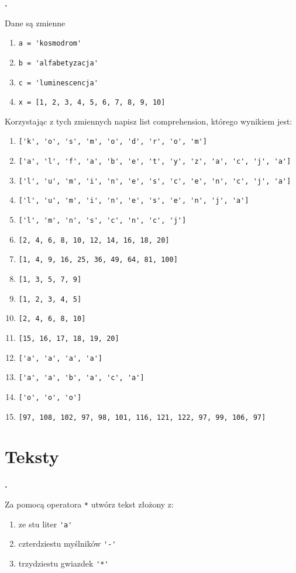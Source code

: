 \documentclass[a4paper]{article}
\begin{document}
\textbf{.}\addtocounter{zadanie}{1} Dane są zmienne
\begin{enumerate}[]
    \item \verb|a = 'kosmodrom'|
    \item \verb|b = 'alfabetyzacja'|
    \item \verb|c = 'luminescencja'|
    \item \verb|x = [1, 2, 3, 4, 5, 6, 7, 8, 9, 10]|
\end{enumerate}

Korzystając z tych zmiennych napisz list comprehension, którego wynikiem jest:
\begin{enumerate}[label=\arabic*.]
    \item \verb|['k', 'o', 's', 'm', 'o', 'd', 'r', 'o', 'm']|
    \item \verb|['a', 'l', 'f', 'a', 'b', 'e', 't', 'y', 'z', 'a', 'c', 'j', 'a']|
    \item \verb|['l', 'u', 'm', 'i', 'n', 'e', 's', 'c', 'e', 'n', 'c', 'j', 'a']|
    \item \verb|['l', 'u', 'm', 'i', 'n', 'e', 's', 'e', 'n', 'j', 'a']|
    \item \verb|['l', 'm', 'n', 's', 'c', 'n', 'c', 'j']|
    \item \verb|[2, 4, 6, 8, 10, 12, 14, 16, 18, 20]|
    \item \verb|[1, 4, 9, 16, 25, 36, 49, 64, 81, 100]|
    \item \verb|[1, 3, 5, 7, 9]|
    \item \verb|[1, 2, 3, 4, 5]|
    \item \verb|[2, 4, 6, 8, 10]|
    \item \verb|[15, 16, 17, 18, 19, 20]|
    \item \verb|['a', 'a', 'a', 'a']|
    \item \verb|['a', 'a', 'b', 'a', 'c', 'a']|
    \item \verb|['o', 'o', 'o']|
    \item \verb|[97, 108, 102, 97, 98, 101, 116, 121, 122, 97, 99, 106, 97]|
\end{enumerate}


\section{Teksty}
\textbf{.}\addtocounter{zadanie}{1} Za pomocą operatora \verb|*| utwórz tekst złożony z:
\begin{enumerate}[label=\arabic*.]
    \item ze stu liter \verb|'a'|
    \item czterdziestu myślników \verb|'-'|
    \item trzydziestu gwiazdek \verb|'*'|
\end{enumerate}
\end{document}
